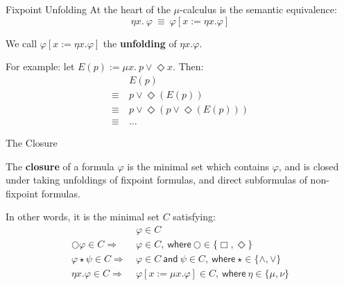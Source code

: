 \documentclass[aspectratio=169]{beamer}
\begin{document}
\begin{frame}{Fixpoint Unfolding}
  At the heart of the $\mu$-calculus is the semantic equivalence:
    \begin{equation*}
      \eta x.~\varphi~\equiv~\varphi [ x := \eta x.\varphi]
    \end{equation*}

  We call $\varphi [ x := \eta x.\varphi ]$ the \textbf{unfolding} of $\eta x.\varphi$.

\bigskip

  For example: let $E(p) := \mu x.~p \lor \Diamond x$. Then:
\pause
  \begin{align*}
    &E(p) \\
    \equiv~&p \lor \Diamond(E(p)) \\
    \equiv~&p \lor \Diamond(p \lor \Diamond(E(p))) \\
    \equiv~&\ldots
  \end{align*}

  \bigskip


\end{frame}

\begin{frame}{The Closure}
  \begin{definition}
    The \textbf{closure} of a formula $\varphi$ is the minimal set which contains $\varphi$, and is closed under taking unfoldings of fixpoint formulas, and direct subformulas of non-fixpoint formulas.
  \end{definition}

  \bigskip

  In other words, it is the minimal set $C$ satisfying:
    \begin{align*}
      &\varphi \in C \\
      \bigcirc \varphi \in C \Rightarrow~&\varphi \in C,~\mathsf{where}~\bigcirc \in \{\Box,\Diamond\} \\
      \varphi \star \psi \in C \Rightarrow~&\varphi \in C~\mathsf{and}~\psi \in C,~\mathsf{where}~\star \in \{\land,\lor\} \\
      \eta x. \varphi \in C \Rightarrow~&\varphi [ x := \mu x. \varphi] \in C,~\mathsf{where}~\eta \in \{\mu,\nu\}
    \end{align*}
\end{frame}
\end{document}
